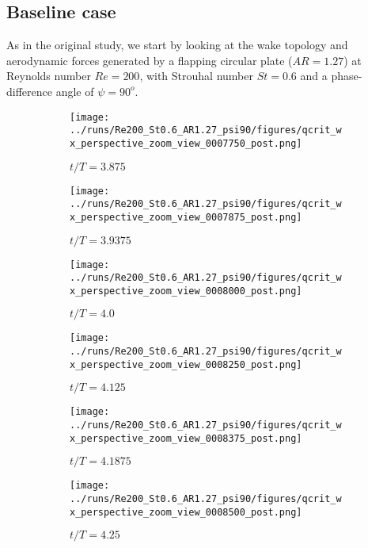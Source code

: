 \subsection{Baseline case}

As in the original study, we start by looking at the wake topology and aerodynamic forces generated by a flapping circular plate ($AR = 1.27$) at Reynolds number $Re = 200$, with Strouhal number $St = 0.6$ and a phase-difference angle of $\psi = 90^o$.

\begin{figure}
  \centering
  \begin{subfigure}[b]{0.3\textwidth}
    \centering
    \texttt{[image: ../runs/Re200\_St0.6\_AR1.27\_psi90/figures/qcrit\_wx\_perspective\_zoom\_view\_0007750\_post.png]}
    \caption{$t / T = 3.875$}
  \end{subfigure}
  \hfill
  \begin{subfigure}[b]{0.3\textwidth}
    \centering
    \texttt{[image: ../runs/Re200\_St0.6\_AR1.27\_psi90/figures/qcrit\_wx\_perspective\_zoom\_view\_0007875\_post.png]}
    \caption{$t / T = 3.9375$}
  \end{subfigure}
  \hfill
  \begin{subfigure}[b]{0.3\textwidth}
    \centering
    \texttt{[image: ../runs/Re200\_St0.6\_AR1.27\_psi90/figures/qcrit\_wx\_perspective\_zoom\_view\_0008000\_post.png]}
    \caption{$t / T = 4.0$}
  \end{subfigure}
  \vspace{1cm}
  \begin{subfigure}[b]{0.3\textwidth}
    \centering
    \texttt{[image: ../runs/Re200\_St0.6\_AR1.27\_psi90/figures/qcrit\_wx\_perspective\_zoom\_view\_0008250\_post.png]}
    \caption{$t / T = 4.125$}
  \end{subfigure}
  \hfill
  \begin{subfigure}[b]{0.3\textwidth}
    \centering
    \texttt{[image: ../runs/Re200\_St0.6\_AR1.27\_psi90/figures/qcrit\_wx\_perspective\_zoom\_view\_0008375\_post.png]}
    \caption{$t / T = 4.1875$}
  \end{subfigure}
  \hfill
  \begin{subfigure}[b]{0.3\textwidth}
    \centering
    \texttt{[image: ../runs/Re200\_St0.6\_AR1.27\_psi90/figures/qcrit\_wx\_perspective\_zoom\_view\_0008500\_post.png]}
    \caption{$t / T = 4.25$}
  \end{subfigure}
  \vspace{1cm}
  \begin{subfigure}[b]{0.3\textwidth}

\end{subfigure}
\end{figure}
